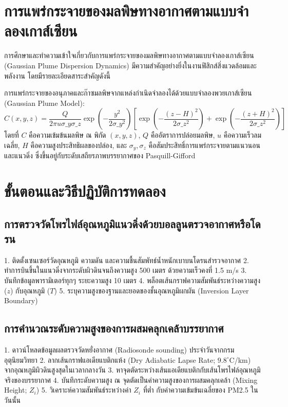 \section{การแพร่กระจายของมลพิษทางอากาศตามแบบจำลองเกาส์เซียน}

การศึกษาและทำความเข้าใจเกี่ยวกับการแพร่กระจายของมลพิษทางอากาศตามแบบจำลองเกาส์เซียน (Gaussian Plume Dispersion Dynamics) มีความสำคัญอย่างยิ่งในงานฟิสิกส์สิ่งแวดล้อมและพลังงาน โดยมีรายละเอียดสาระสำคัญดังนี้

การแพร่กระจายของอนุภาคและก๊าซมลพิษจากแหล่งกำเนิดจำลองได้ด้วยแบบจำลองพวยเกาส์เซียน (Gaussian Plume Model):
\[ C(x,y,z) = \frac{Q}{2\pi u \sigma\_y \sigma\_z} \exp\left( -\frac{y^2}{2\sigma\_y^2} \right) \left[ \exp\left( -\frac{(z-H)^2}{2\sigma\_z^2} \right) + \exp\left( -\frac{(z+H)^2}{2\sigma\_z^2} \right) \right] \]
โดยที่ $C$ คือความเข้มข้นมลพิษ ณ พิกัด $(x,y,z)$, $Q$ คืออัตราการปล่อยมลพิษ, $u$ คือความเร็วลมเฉลี่ย, $H$ คือความสูงประสิทธิผลของปล่อง, และ $\sigma_y, \sigma_z$ คือสัมประสิทธิ์การแพร่กระจายตามแนวนอนและแนวดิ่ง ซึ่งขึ้นอยู่กับระดับเสถียรภาพบรรยากาศของ Pasquill-Gifford

\section{ขั้นตอนและวิธีปฏิบัติการทดลอง}

\subsection{การตรวจวัดโพรไฟล์อุณหภูมิแนวดิ่งด้วยบอลลูนตรวจอากาศหรือโดรน}
\begin{conceptbox}
1. ติดตั้งเซนเซอร์วัดอุณหภูมิ ความดัน และความชื้นสัมพัทธ์น้ำหนักเบาบนโดรนสำรวจอากาศ
2. ทำการบินขึ้นในแนวดิ่งจากระดับผิวดินจนถึงความสูง 500 เมตร ด้วยความเร็วคงที่ 1.5 m/s
3. บันทึกข้อมูลพารามิเตอร์ทุกๆ ระยะความสูง 10 เมตร
4. พล็อตเส้นกราฟความสัมพันธ์ระหว่างความสูง ($z$) กับอุณหภูมิ ($T$)
5. ระบุความสูงของฐานและยอดของชั้นอุณหภูมิผกผัน (Inversion Layer Boundary)
\end{conceptbox}

\subsection{การคำนวณระดับความสูงของการผสมคลุกเคล้าบรรยากาศ}
\begin{conceptbox}
1. ดาวน์โหลดข้อมูลผลตรวจวัดหยั่งอากาศ (Radiosonde sounding) ประจำวันจากกรมอุตุนิยมวิทยา
2. ลากเส้นกราฟแอเดียแบติกแห้ง (Dry Adiabatic Lapse Rate; $9.8^{\circ}$C/km) จากอุณหภูมิผิวดินสูงสุดในเวลากลางวัน
3. หาจุดตัดระหว่างเส้นแอเดียแบติกกับเส้นโพรไฟล์อุณหภูมิจริงของบรรยากาศ
4. บันทึกระดับความสูง ณ จุดตัดเป็นค่าความสูงของการผสมคลุกเคล้า (Mixing Height; $Z_i$)
5. วิเคราะห์ความสัมพันธ์ระหว่างค่า $Z_i$ ที่ต่ำ กับค่าความเข้มข้นเฉลี่ยของ PM2.5 ในวันนั้น
\end{conceptbox}

